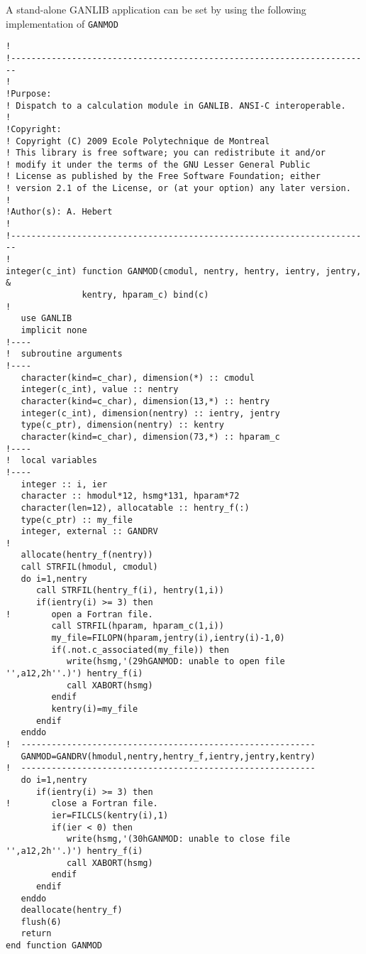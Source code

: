 \vskip 0.08cm

A stand-alone GANLIB application can be set by using the following implementation of {\tt GANMOD}
\begin{verbatim}
!
!-----------------------------------------------------------------------
!
!Purpose:
! Dispatch to a calculation module in GANLIB. ANSI-C interoperable.
!
!Copyright:
! Copyright (C) 2009 Ecole Polytechnique de Montreal
! This library is free software; you can redistribute it and/or
! modify it under the terms of the GNU Lesser General Public
! License as published by the Free Software Foundation; either
! version 2.1 of the License, or (at your option) any later version.
!
!Author(s): A. Hebert
!
!-----------------------------------------------------------------------
!
integer(c_int) function GANMOD(cmodul, nentry, hentry, ientry, jentry, &
               kentry, hparam_c) bind(c)
!
   use GANLIB
   implicit none
!----
!  subroutine arguments
!----
   character(kind=c_char), dimension(*) :: cmodul
   integer(c_int), value :: nentry 
   character(kind=c_char), dimension(13,*) :: hentry
   integer(c_int), dimension(nentry) :: ientry, jentry
   type(c_ptr), dimension(nentry) :: kentry
   character(kind=c_char), dimension(73,*) :: hparam_c
!----
!  local variables
!----
   integer :: i, ier
   character :: hmodul*12, hsmg*131, hparam*72
   character(len=12), allocatable :: hentry_f(:)
   type(c_ptr) :: my_file
   integer, external :: GANDRV
!
   allocate(hentry_f(nentry))
   call STRFIL(hmodul, cmodul)
   do i=1,nentry
      call STRFIL(hentry_f(i), hentry(1,i))
      if(ientry(i) >= 3) then
!        open a Fortran file.
         call STRFIL(hparam, hparam_c(1,i))
         my_file=FILOPN(hparam,jentry(i),ientry(i)-1,0)
         if(.not.c_associated(my_file)) then
            write(hsmg,'(29hGANMOD: unable to open file '',a12,2h''.)') hentry_f(i)
            call XABORT(hsmg)
         endif
         kentry(i)=my_file
      endif
   enddo
!  ----------------------------------------------------------
   GANMOD=GANDRV(hmodul,nentry,hentry_f,ientry,jentry,kentry)
!  ----------------------------------------------------------
   do i=1,nentry
      if(ientry(i) >= 3) then
!        close a Fortran file.
         ier=FILCLS(kentry(i),1)
         if(ier < 0) then
            write(hsmg,'(30hGANMOD: unable to close file '',a12,2h''.)') hentry_f(i)
            call XABORT(hsmg)
         endif
      endif
   enddo
   deallocate(hentry_f)
   flush(6)
   return
end function GANMOD
\end{verbatim}

